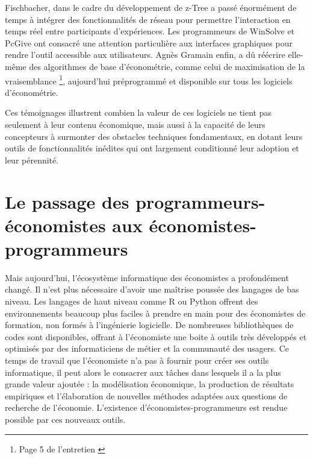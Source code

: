 Fischbacher, dans le cadre du développement de z-Tree a passé énormément de temps à intégrer des fonctionnalités de réseau pour permettre l’interaction en temps réel entre participants d’expériences. Les programmeurs de WinSolve et PcGive ont consacré une attention particulière aux interfaces graphiques pour rendre l’outil accessible aux utilisateurs. Agnès Gramain enfin, a dû réécrire elle-même des algorithmes de base d’économétrie, comme celui de maximisation de la vraisemblance \footnote{Page 5 de l'entretien \cite{gramainInterviewAgnesGramain2024}}, aujourd'hui préprogrammé et disponible sur tous les logiciels d'économétrie.

Ces témoignages illustrent combien la valeur de ces logiciels ne tient pas seulement à leur contenu économique, mais aussi à la capacité de leurs concepteurs à surmonter des obstacles techniques fondamentaux, en dotant leurs outils de fonctionnalités inédites qui ont largement conditionné leur adoption et leur pérennité.










\section{Le passage des programmeurs-économistes aux économistes-programmeurs}


Mais aujourd’hui, l’écosystème informatique des économistes a profondément changé. Il n’est plus nécessaire d'avoir une maîtrise poussée des langages de bas niveau. Les langages de haut niveau comme R ou Python offrent des environnements beaucoup plus faciles à prendre en main pour des économistes de formation, non formés à l'ingénierie logicielle.
De nombreuses bibliothèques de codes sont disponibles, offrant à l'économiste une boite à outils très développés et optimisés par des informaticiens de métier et la communauté des usagers. Ce temps de travail que l'économiste n'a pas à fournir pour créer ses outils informatique, il peut alors le consacrer aux tâches dans lesquels il a la plus grande valeur ajoutée : la modélisation économique, la production de résultats empiriques et l’élaboration de nouvelles méthodes adaptées aux questions de recherche de l'économie. L'existence d'économistes-programmeurs est rendue possible par ces nouveaux outils.

